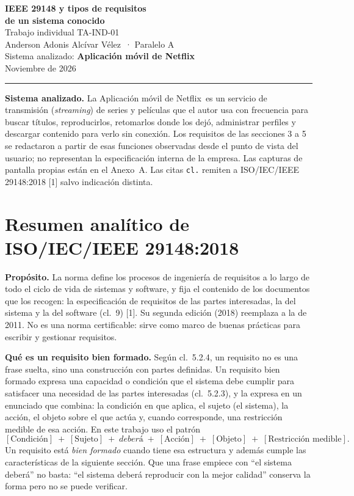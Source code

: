 \documentclass[11pt,a4paper]{article}
\newcommand{\NombreAutor}{Anderson Adonis Alc\'ivar V\'elez}
\newcommand{\Paralelo}{A}
\newcommand{\SistemaNombre}{Aplicaci\'on m\'ovil de Netflix}
\newcommand{\cl}[1]{cl.~#1}
\begin{document}
\begin{center}
{\LARGE\bfseries IEEE 29148 y tipos de requisitos\\ de un sistema conocido}\\[6pt]
{\large Trabajo individual TA-IND-01}\\[8pt]
\NombreAutor\ · Paralelo \Paralelo\\
Sistema analizado: \textbf{\SistemaNombre}\\
Noviembre de 2026
\end{center}

\vspace{4pt}
\hrule
\vspace{6pt}

\textbf{Sistema analizado.} La \SistemaNombre\ es un servicio de transmisi\'on (\emph{streaming}) de series y pel\'iculas que el autor usa con frecuencia para buscar t\'itulos, reproducirlos, retomarlos donde los dej\'o, administrar perfiles y descargar contenido para verlo sin conexi\'on. Los requisitos de las secciones 3 a 5 se redactaron a partir de esas funciones observadas desde el punto de vista del usuario; no representan la especificaci\'on interna de la empresa. Las capturas de pantalla propias est\'an en el Anexo~A. Las citas \texttt{cl.} remiten a ISO/IEC/IEEE 29148:2018 [1] salvo indicaci\'on distinta.

\section{Resumen anal\'itico de ISO/IEC/IEEE 29148:2018}

\textbf{Prop\'osito.} La norma define los procesos de ingenier\'ia de requisitos a lo largo de todo el ciclo de vida de sistemas y software, y fija el contenido de los documentos que los recogen: la especificaci\'on de requisitos de las partes interesadas, la del sistema y la del software (\cl{9}) [1]. Su segunda edici\'on (2018) reemplaza a la de 2011. No es una norma certificable: sirve como marco de buenas pr\'acticas para escribir y gestionar requisitos.

\textbf{Qu\'e es un requisito bien formado.} Seg\'un \cl{5.2.4}, un requisito no es una frase suelta, sino una construcci\'on con partes definidas. Un requisito bien formado expresa una capacidad o condici\'on que el sistema debe cumplir para satisfacer una necesidad de las partes interesadas (\cl{5.2.3}), y la expresa en un enunciado que combina: la condici\'on en que aplica, el sujeto (el sistema), la acci\'on, el objeto sobre el que act\'ua y, cuando corresponde, una restricci\'on medible de esa acci\'on. En este trabajo uso el patr\'on
\[
[\text{Condici\'on}]\;+\;[\text{Sujeto}]\;+\;\textit{deber\'a}\;+\;[\text{Acci\'on}]\;+\;[\text{Objeto}]\;+\;[\text{Restricci\'on medible}].
\]
Un requisito est\'a \emph{bien formado} cuando tiene esa estructura y adem\'as cumple las caracter\'isticas de la siguiente secci\'on. Que una frase empiece con ``el sistema deber\'a'' no basta: ``el sistema deber\'a reproducir con la mejor calidad'' conserva la forma pero no se puede verificar.
\end{document}
